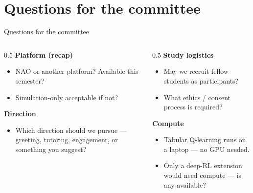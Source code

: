 \documentclass[aspectratio=169,10pt]{beamer}
\begin{document}
\section{Questions for the committee}

\begin{frame}{Questions for the committee}
  \begin{columns}[T]
    \begin{column}{0.5\textwidth}
      \textbf{Platform (recap)}
      \begin{itemize}\footnotesize
        \item NAO or another platform? Available this semester?
        \item Simulation-only acceptable if not?
      \end{itemize}
      \textbf{Direction}
      \begin{itemize}\footnotesize
        \item Which direction should we pursue --- greeting, tutoring, engagement, or something you suggest?
      \end{itemize}
    \end{column}
    \begin{column}{0.5\textwidth}
      \textbf{Study logistics}
      \begin{itemize}\footnotesize
        \item May we recruit fellow students as participants?
        \item What ethics / consent process is required?
      \end{itemize}
      \textbf{Compute}
      \begin{itemize}\footnotesize
        \item Tabular Q-learning runs on a laptop --- no GPU needed.
        \item Only a deep-RL extension would need compute --- is any available?
      \end{itemize}
    \end{column}
  \end{columns}
\end{frame}
\end{document}

